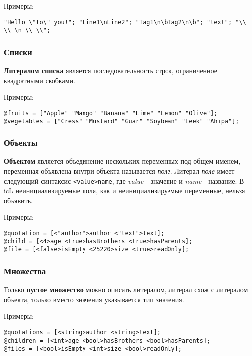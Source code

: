 \documentclass[a4paper, 14pt]{extarticle}
\begin{document}
\noindent Примеры:
\begin{lstlisting}[numbers=none]
"Hello \"to\" you!"; "Line1\nLine2"; "Tag1\n\bTag2\n\b"; "text"; "\\ \\ \n \\ \\";
\end{lstlisting}

\subsubsection{Списки}

{\bf Литералом списка} является последовательность строк, ограниченное квадратными скобками.

\noindent Примеры:
\begin{lstlisting}[numbers=none]
@fruits = ["Apple" "Mango" "Banana" "Lime" "Lemon" "Olive"];
@vegetables = ["Cress" "Mustard" "Guar" "Soybean" "Leek" "Ahipa"];
\end{lstlisting}

\subsubsection{Объекты}

{\bf Объектом} является объединение нескольких переменных под общем именем, переменная объявлена внутри объекта называется {\it поле}. Литерал {\it поле} имеет следующий синтаксис \lstinline`<value>name`, где  {\it value} - значение и {\it name} - название. В icL неинициализируемые поля, как и неинициализируемые переменные, нельзя объявить.

\noindent Примеры:
\begin{lstlisting}[numbers=none]
@quotation = [<"author">author <"text">text];
@child = [<4>age <true>hasBrothers <true>hasParents];
@file = [<false>isEmpty <25220>size <true>readOnly];
\end{lstlisting}

\subsubsection{Множества}

Только {\bf пустое множество} можно описать литералом, литерал схож с литералом объекта, только вместо значения указывается тип значения.

\noindent Примеры:
\begin{lstlisting}[numbers=none]
@quotations = [<string>author <string>text];
@children = [<int>age <bool>hasBrothers <bool>hasParents];
@files = [<bool>isEmpty <int>size <bool>readOnly];
\end{lstlisting}
\end{document}
